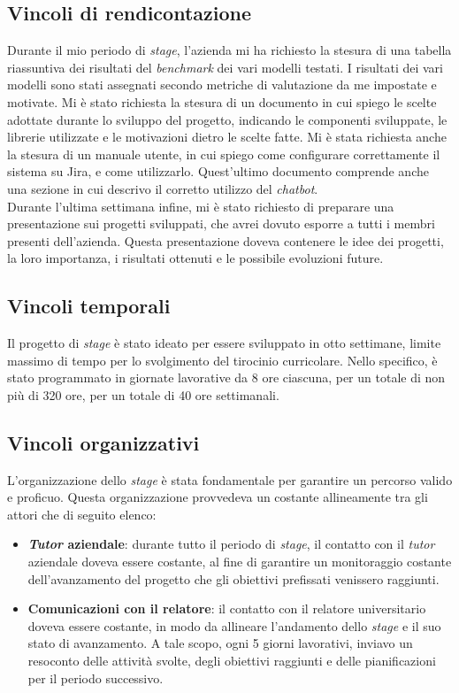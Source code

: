 \subsection{Vincoli di rendicontazione}
Durante il mio periodo di \textit{stage}, l'azienda mi ha richiesto la stesura di una tabella riassuntiva dei risultati del \textit{benchmark} dei vari modelli testati. I risultati dei vari modelli sono stati assegnati secondo metriche di valutazione da me impostate e motivate.
Mi è stato richiesta la stesura di un documento in cui spiego le scelte adottate durante lo sviluppo del progetto, indicando le componenti sviluppate, le librerie utilizzate e le motivazioni dietro le scelte fatte.
Mi è stata richiesta anche la stesura di un manuale utente, in cui spiego come configurare correttamente il sistema su Jira, e come utilizzarlo. Quest'ultimo documento comprende anche una sezione in cui descrivo il corretto utilizzo del \textit{chatbot}.\\
Durante l'ultima settimana infine, mi è stato richiesto di preparare una presentazione sui progetti sviluppati, che avrei dovuto esporre a tutti i membri presenti dell'azienda. Questa presentazione doveva contenere le idee dei progetti, la loro importanza, i risultati ottenuti e le possibile evoluzioni future.
\subsection{Vincoli temporali}
Il progetto di \textit{stage} è stato ideato per essere sviluppato in otto settimane, limite massimo di tempo per lo svolgimento del tirocinio curricolare. Nello specifico, è stato programmato in giornate lavorative da 8 ore ciascuna, per un totale di non più di 320 ore, per un totale di 40 ore settimanali.

\subsection{Vincoli organizzativi}
L'organizzazione dello \textit{stage} è stata fondamentale per garantire un percorso valido e proficuo. Questa organizzazione provvedeva un costante allineamente tra gli attori che di seguito elenco:
\begin{itemize}
    \item \textbf{\textit{Tutor} aziendale}: durante tutto il periodo di \textit{stage}, il contatto con il \textit{tutor} aziendale doveva essere costante, al fine di garantire un monitoraggio costante dell'avanzamento del progetto che gli obiettivi prefissati venissero raggiunti. 
    \item \textbf{Comunicazioni con il relatore}: il contatto con il relatore universitario doveva essere costante, in modo da allineare l'andamento dello \textit{stage} e il suo stato di avanzamento. A tale scopo, ogni 5 giorni lavorativi, inviavo un resoconto delle attività svolte, degli obiettivi raggiunti e delle pianificazioni per il periodo successivo.
\end{itemize}
